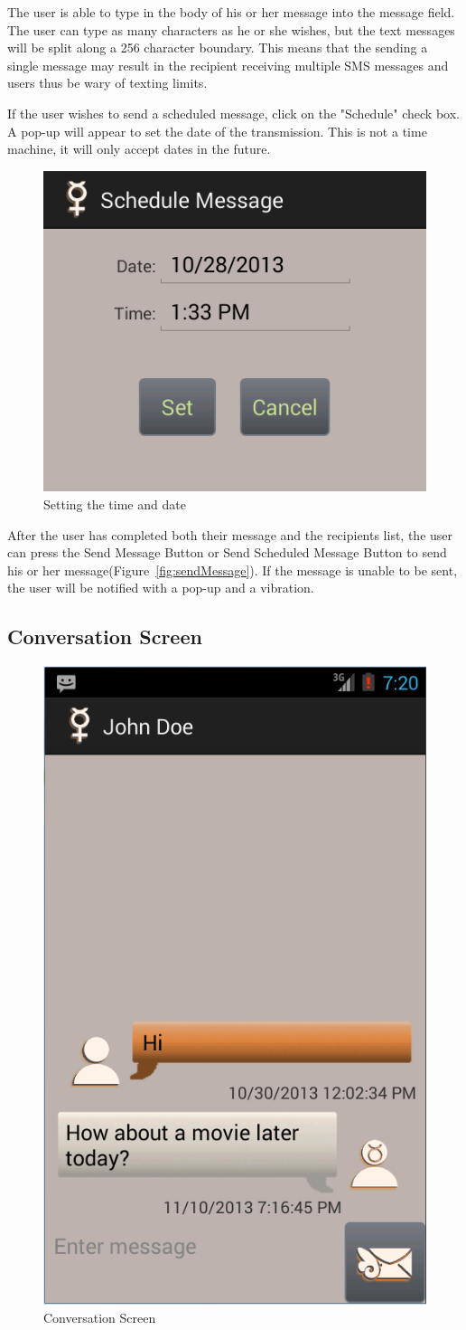 \documentclass{article}
\begin{document}
\par The user is able to type in the body of his or her message into the message field. The user can type as many characters as he or she wishes, but the text messages will be split along a 256 character boundary.
This means that the sending a single message may result in the recipient receiving multiple SMS messages and users thus be wary of texting limits.

\par If the user wishes to send a scheduled message, click on the "Schedule" check box. A pop-up will appear to set the date of the transmission. This is not a time machine, it will only accept dates in the future.

\begin{figure}[h!]
\centering
\includegraphics[width=.25\textwidth]{"./Screen_shots/Schedule_Message_Popup"}{}
\caption{Setting the time and date}
\label{fig:SchedPopUp}
\end{figure}



\par After the user has completed both their message and the recipients list, the user can press the Send Message Button or Send Scheduled Message Button to send his or her message(Figure~\ref{fig:sendMessage}).
If the message is unable to be sent, the user will be notified with a pop-up and a vibration.



\pagebreak

\subsection{Conversation Screen}
\label{sec:Conversation}

\begin{figure}[ht!]
\centering
\includegraphics[width=.25\textwidth]{"./Screen_shots/Conversation_Screen"}{}
\caption{Conversation Screen}
\label{fig:ConversationScreen}
\end{figure}
\end{document}
